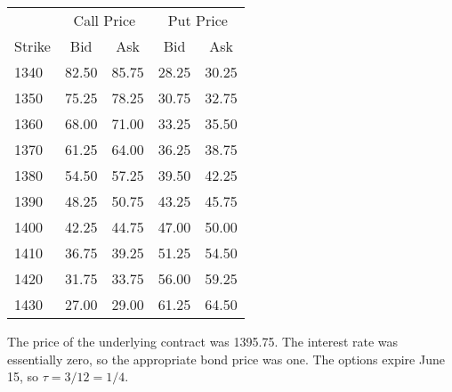 \documentclass[11pt]{exam}
\begin{document}
\begin{questions}
\begin{center}
\tabcolsep=0.15in
\begin{tabular}{lcccc}
\toprule
      &  \multicolumn{2}{c}{Call Price} &  \multicolumn{2}{c}{Put Price}  \\
Strike    &  Bid & Ask &  Bid & Ask  \\
\midrule
1340  & 82.50 & 85.75 & 28.25 & 30.25 \\
1350  & 75.25 & 78.25 & 30.75 & 32.75 \\
1360  & 68.00 & 71.00 & 33.25 & 35.50  \\
1370  & 61.25 & 64.00 & 36.25 & 38.75 \\
1380  & 54.50 & 57.25 & 39.50 & 42.25 \\
1390  & 48.25 & 50.75 & 43.25 & 45.75  \\
1400  & 42.25 & 44.75 & 47.00 & 50.00  \\
1410  & 36.75 & 39.25 & 51.25 & 54.50   \\
1420  & 31.75 & 33.75 & 56.00 & 59.25 \\
1430  & 27.00 & 29.00 & 61.25 & 64.50  \\
\bottomrule
\end{tabular}
\end{center}
The price of the underlying contract was 1395.75.
The interest rate was essentially zero, so the appropriate bond price was one.
The options expire June 15, so $\tau = 3/12 = 1/4 $.


\begin{solution}
\end{solution}
\end{questions}
\end{document}
